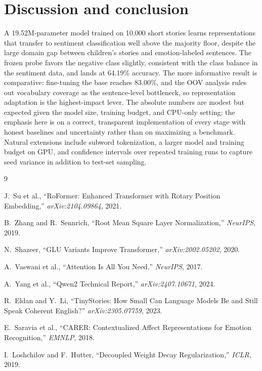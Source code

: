 \documentclass[11pt]{article}
\begin{document}
\section{Discussion and conclusion}
A 19.52M-parameter model trained on 10{,}000 short stories learns representations
that transfer to sentiment classification well above the majority floor, despite
the large domain gap between children's stories and emotion-labeled sentences.
The frozen probe favors the negative class slightly, consistent with the class
balance in the sentiment data, and lands at 64.19\% accuracy. The more
informative result is comparative: fine-tuning the base reaches 83.00\%, and the
OOV analysis rules out vocabulary coverage as the sentence-level bottleneck, so
representation adaptation is the highest-impact lever. The absolute numbers are
modest but expected given the model size, training budget, and CPU-only setting;
the emphasis here is on a correct, transparent implementation of every stage with
honest baselines and uncertainty rather than on maximizing a benchmark. Natural
extensions include subword tokenization, a larger model and training budget on
GPU, and confidence intervals over repeated training runs to capture seed
variance in addition to test-set sampling.

\begin{thebibliography}{9}
\raggedright

J.~Su et al., ``RoFormer: Enhanced Transformer with Rotary Position Embedding,''
\emph{arXiv:2104.09864}, 2021.

B.~Zhang and R.~Sennrich, ``Root Mean Square Layer Normalization,''
\emph{NeurIPS}, 2019.

N.~Shazeer, ``GLU Variants Improve Transformer,'' \emph{arXiv:2002.05202}, 2020.

A.~Vaswani et al., ``Attention Is All You Need,'' \emph{NeurIPS}, 2017.

A.~Yang et al., ``Qwen2 Technical Report,'' \emph{arXiv:2407.10671}, 2024.

R.~Eldan and Y.~Li, ``TinyStories: How Small Can Language Models Be and Still
Speak Coherent English?'' \emph{arXiv:2305.07759}, 2023.

E.~Saravia et al., ``CARER: Contextualized Affect Representations for Emotion
Recognition,'' \emph{EMNLP}, 2018.

I.~Loshchilov and F.~Hutter, ``Decoupled Weight Decay Regularization,''
\emph{ICLR}, 2019.

\end{thebibliography}
\end{document}
